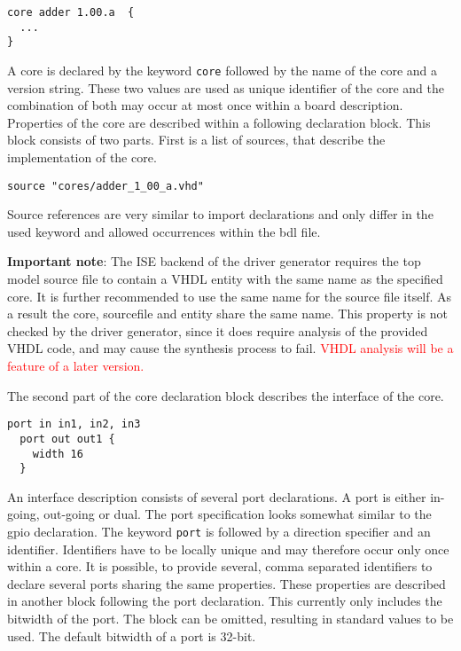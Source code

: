 \documentclass{report}
\begin{document}
\begin{lstlisting}[language=bdl]
core adder 1.00.a  {
  ...
}
\end{lstlisting}

A core is declared by the keyword \texttt{core} followed by the name of the core and a version string. These two values are used as unique identifier of the core and the combination of both may occur at most once within a board description. Properties of the core are described within a following declaration block. This block consists of two parts. First is a list of sources, that describe the implementation of the core.

\begin{lstlisting}[language=bdl]
  source "cores/adder_1_00_a.vhd"
\end{lstlisting}

Source references are very similar to import declarations and only differ in the used keyword and allowed occurrences within the bdl file.

\textbf{Important note}: The ISE backend of the driver generator requires the top model source file to contain a VHDL entity with the same name as the specified core. It is further recommended to use the same name for the source file itself. As a result the core, sourcefile and entity share the same name. This property is not checked by the driver generator, since it does require analysis of the provided VHDL code, and may cause the synthesis process to fail. \textcolor{red}{VHDL analysis will be a feature of a later version.}

The second part of the core declaration block describes the interface of the core.

\begin{lstlisting}[language=bdl]
  port in in1, in2, in3
  port out out1 {
    width 16
  }
\end{lstlisting}

An interface description consists of several port declarations. A port is either in-going, out-going or dual. The port specification looks somewhat similar to the gpio declaration. The keyword \texttt{port} is followed by a direction specifier and an identifier. Identifiers have to be locally unique and may therefore occur only once within a core. It is possible, to provide several, comma separated identifiers to declare several ports sharing the same properties. These properties are described in another block following the port declaration. This currently only includes the bitwidth of the port. The block can be omitted, resulting in standard values to be used. The default bitwidth of a port is 32-bit.
\end{document}
